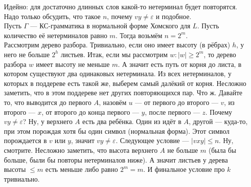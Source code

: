 \documentclass{article}
\begin{document}
\begin{itemize}
\begin{Proof}
\begin{figure}[H]
\qquad\qquad
            \end{figure}\noindent
            Идейно: для достаточно длинных слов какой-то нетерминал будет повторятся. Надо только обсудить, что такое $n$, почему $vy\neq\varepsilon$ и подобное.\\
            Пусть $\Gamma$ --- КС-грамматика в нормальной форме Хомского для $L$. Пусть количество её нетерминалов равно $m$. Тогда возьмём $n=2^m$.\\
            Рассмотрим дерево разбора. Тривиально, если оно имеет высоту (в рёбрах) $h$, у него не больше $2^h$ листьев. Итак, если мы рассмотрим $w:|w|\geqslant2^m$, то дерево разбора $w$ имеет высоту не меньше $m$. А значит есть путь от корня до листа, в котором существуют два одинаковых нетерминала. Из всех нетерминалов, у которых в поддереве есть такой же, выберем самый далёкий от корня. Несложно заметить, что в этом поддереве нет других повторяющихся пар. Что ж. Давайте то, что выводится до первого $A$, назовём $u$ --- от первого до второго --- $v$, из второго --- $x$, от второго до конца первого --- $y$, после первого --- $z$. Почему $vy\neq\varepsilon$? Ну, у верхнего $A$ есть два ребёнка. Один из идёт в $A$, другой --- куда-то, при этом порождая хотя бы один символ (нормальная форма). Этот символ порождается в $v$ или $y$, значит $vy\neq\varepsilon$. Следующее условие --- $|vxy|\leqslant n$. Ну, смотрите. Несложно заметить, что высота верхнего $A$ не больше $m$ (была бы больше, были бы повторы нетерминалов ниже). А значит листьев у дерева высоты $\leqslant m$ есть меньше либо равно $2^m=m$. И финальное условие про $k$ тривиально.

\end{Proof}
\end{itemize}
\end{document}
